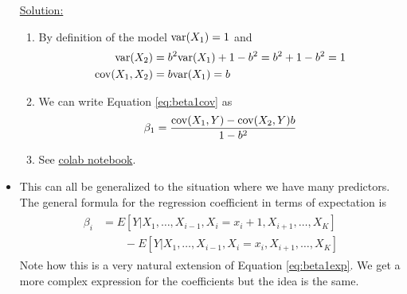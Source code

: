 \begin{itemize}
\begin{example}
\noindent
\underline{Solution:} 
\begin{enumerate}[label=(\alph*)]
\item By definition of the model ${\rm var}(X_1)=1$ and 
\begin{align*}
{\rm var}(X_2) &= b^2{\rm var}(X_1) + 1-b^2 = b^2+1-b^2 = 1\\
{\rm cov}(X_1,X_2) &= b{\rm var}(X_1) = b
\end{align*}
\item We can write Equation \ref{eq:beta1cov} as
\begin{equation*}
\beta_1 =  \frac{ {\rm cov}(X_1,Y)- {\rm cov}(X_2,Y)b}{1 -b^2}
\end{equation*}
\item See \href{https://colab.research.google.com/drive/1oIRgP_7-c5DGV1D2iz5nj406mZfJxUIG?usp=sharing}{colab notebook}.
\end{enumerate}


\end{example}

\item This can all be generalized to the situation where we have many predictors. The general formula for the regression coefficient in terms of expectation is 
\begin{align*}
\begin{split}
\beta_i &= E[Y|X_1,\dots,X_{i-1},X_i=x_i+1,X_{i+1},\dots,X_K]\\
&\quad\quad - E[Y|X_1,\dots,X_{i-1},X_i=x_i,X_{i+1},\dots,X_K]
\end{split}
\end{align*}
Note how this is a very natural extension of Equation \ref{eq:beta1exp}. 
We get a more complex expression for the coefficients but the idea is the same. 

\end{itemize}

